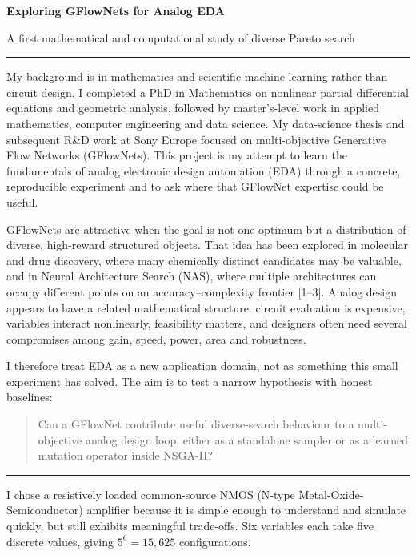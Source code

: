 \documentclass[10pt,a4paper]{article}
\newcommand{\rsection}[1]{\vspace{4pt}{\large\bfseries\textcolor{accent}{#1}}\par\vspace{-2pt}\textcolor{muted}{\rule{\textwidth}{0.5pt}}}
\begin{document}
{\fontsize{25}{29}\selectfont\bfseries Exploring GFlowNets for Analog EDA}\par
{\large\color{accent}A first mathematical and computational study of diverse Pareto search}\par
{}

\rsection{Motivation}

My background is in mathematics and scientific machine learning rather than circuit design. I completed a PhD in Mathematics on nonlinear partial differential equations and geometric analysis, followed by master's-level work in applied mathematics, computer engineering and data science. My data-science thesis and subsequent R\&D work at Sony Europe focused on multi-objective Generative Flow Networks (GFlowNets). This project is my attempt to learn the fundamentals of analog electronic design automation (EDA) through a concrete, reproducible experiment and to ask where that GFlowNet expertise could be useful.

GFlowNets are attractive when the goal is not one optimum but a distribution of diverse, high-reward structured objects. That idea has been explored in molecular and drug discovery, where many chemically distinct candidates may be valuable, and in Neural Architecture Search (NAS), where multiple architectures can occupy different points on an accuracy--complexity frontier [1--3]. Analog design appears to have a related mathematical structure: circuit evaluation is expensive, variables interact nonlinearly, feasibility matters, and designers often need several compromises among gain, speed, power, area and robustness.

I therefore treat EDA as a new application domain, not as something this small experiment has solved. The aim is to test a narrow hypothesis with honest baselines:

\begin{quote}
Can a GFlowNet contribute useful diverse-search behaviour to a multi-objective analog design loop, either as a standalone sampler or as a learned mutation operator inside NSGA-II?
\end{quote}

\rsection{Circuit and design problem}

I chose a resistively loaded common-source NMOS (N-type Metal-Oxide-Semiconductor) amplifier because it is simple enough to understand and simulate quickly, but still exhibits meaningful trade-offs. Six variables each take five discrete values, giving $5^6=15{,}625$ configurations.
\end{document}
